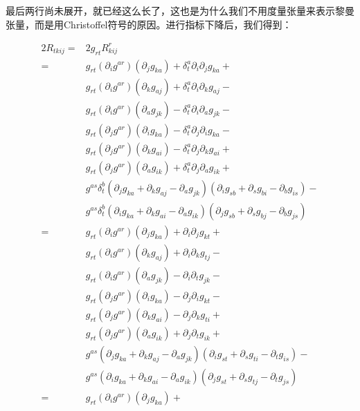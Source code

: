 最后两行尚未展开，就已经这么长了，这也是为什么我们不用度量张量来表示黎曼张量，而是用Christoffel符号的原因。进行指标下降后，我们得到：

\begin{equation}\label{eq_RicciC_2}
\begin{aligned}
2R_{tkij}={}&2g_{rt}R^r_{kij}\\
={}&g_{rt}(\partial_ig^{ar})(\partial_jg_{ka})+\delta^a_t\partial_i\partial_jg_{ka}+\\
&g_{rt}(\partial_ig^{ar})(\partial_kg_{aj})+\delta^a_t\partial_i\partial_kg_{aj}-\\
&g_{rt}(\partial_ig^{ar})(\partial_ag_{jk})-\delta^a_t\partial_i\partial_ag_{jk}-\\%
&g_{rt}(\partial_jg^{ar})(\partial_ig_{ka})-\delta^a_t\partial_j\partial_ig_{ka}-\\
&g_{rt}(\partial_jg^{ar})(\partial_kg_{ai})-\delta^a_t\partial_j\partial_kg_{ai}+\\
&g_{rt}(\partial_jg^{ar})(\partial_ag_{ik})+\delta^a_t\partial_j\partial_ag_{ik}+\\%
&g^{as}\delta^b_t(\partial_jg_{ka}+\partial_kg_{aj}-\partial_ag_{jk})(\partial_ig_{sb}+\partial_sg_{bi}-\partial_bg_{is})-\\
&g^{as}\delta^b_t(\partial_ig_{ka}+\partial_kg_{ai}-\partial_ag_{ik})(\partial_jg_{sb}+\partial_sg_{bj}-\partial_bg_{js})\\
={}&g_{rt}(\partial_ig^{ar})(\partial_jg_{ka})+\partial_i\partial_jg_{kt}+\\
&g_{rt}(\partial_ig^{ar})(\partial_kg_{aj})+\partial_i\partial_kg_{tj}-\\
&g_{rt}(\partial_ig^{ar})(\partial_ag_{jk})-\partial_i\partial_tg_{jk}-\\%
&g_{rt}(\partial_jg^{ar})(\partial_ig_{ka})-\partial_j\partial_ig_{kt}-\\
&g_{rt}(\partial_jg^{ar})(\partial_kg_{ai})-\partial_j\partial_kg_{ti}+\\
&g_{rt}(\partial_jg^{ar})(\partial_ag_{ik})+\partial_j\partial_tg_{ik}+\\%
&g^{as}(\partial_jg_{ka}+\partial_kg_{aj}-\partial_ag_{jk})(\partial_ig_{st}+\partial_sg_{ti}-\partial_tg_{is})-\\
&g^{as}(\partial_ig_{ka}+\partial_kg_{ai}-\partial_ag_{ik})(\partial_jg_{st}+\partial_sg_{tj}-\partial_tg_{js})\\
={}&g_{rt}(\partial_ig^{ar})(\partial_jg_{ka})+\\

\end{aligned}
\end{equation}
